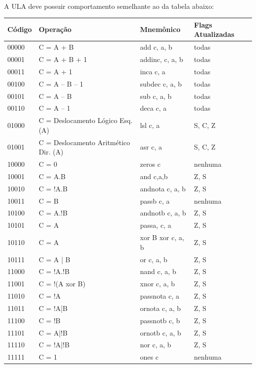 \documentclass{report}
\begin{document}
\paragraph{}
    A ULA deve possuir comportamento semelhante ao da tabela abaixo:
        \begin{table}[H] 
      \begin{center}
        \begin{tabular}[pos]{|m{2cm} | m{4cm}| m{3cm}| m{3.5cm}|} 
          \hline 
          \cellcolor[gray]{0.9}\textbf{Código} & \cellcolor[gray]{0.9}\textbf{Operação} & \cellcolor[gray]{0.9}\textbf{Mnemônico} & \cellcolor[gray]{0.9}\textbf{Flags Atualizadas} \\ \hline
00000 & C = A + B & add c, a, b & todas\\ \hline
00001 & C = A + B + 1 & addinc, c, a, b & todas\\ \hline
00011 & C = A + 1 & inca c, a & todas\\ \hline
00100 & C = A – B – 1 & subdec c, a, b & todas\\ \hline
00101 & C = A – B & sub c, a, b & todas\\ \hline
00110 & C = A – 1 & deca c, a & todas\\ \hline
01000 & C = Deslocamento Lógico Esq. (A) & lsl c, a & S, C, Z\\ \hline
01001 & C = Deslocamento Aritmético Dir. (A) & asr c, a & S, C, Z\\ \hline
10000 & C = 0 & zeros c & nenhuma\\ \hline
10001 & C = A.B & and c,a,b & Z, S\\ \hline
10010 & C = !A.B & andnota c, a, b & Z, S\\ \hline
10011 & C = B & passb c, a & nenhuma\\ \hline
10100 & C = A.!B & andnotb c, a, b & Z, S\\ \hline
10101 & C = A & passa, c, a & Z, S\\ \hline
10110 & C = A & xor B xor c, a, b & Z, S\\ \hline
10111 & C = A | B & or c, a, b & Z, S\\ \hline
11000 & C = !A.!B & nand c, a, b & Z, S\\ \hline
11001 & C = !(A xor B) & xnor c, a, b & Z, S\\ \hline
11010 & C = !A & passnota c, a & Z, S\\ \hline
11011 & C = !A|B & ornota c, a, b & Z, S\\ \hline
11100 & C = !B & passnotb c, b & Z, S\\ \hline
11101 & C = A|!B & ornotb c, a, b & Z, S\\ \hline
11110 & C = !A|!B & nor c, a, b & Z, S\\ \hline
11111 & C = 1 & ones c & nenhuma\\ \hline
          
    \end{tabular}
    \end{center}
    \end{table}
    
\end{document}
